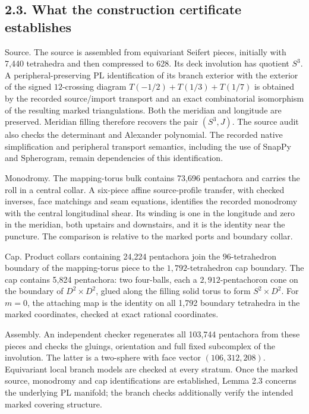 \documentclass[11pt,letterpaper]{article}
\begin{document}
\subsection*{2.3. What the construction certificate establishes}
Source. The source is assembled from equivariant Seifert pieces, initially with 7,440 tetrahedra and then compressed to 628. Its deck involution has quotient $S^3$. A peripheral-preserving PL identification of its branch exterior with the exterior of the signed $12$-crossing diagram $T(-1/2)+T(1/3)+T(1/7)$ is obtained by the recorded source/import transport and an exact combinatorial isomorphism of the resulting marked triangulations. Both the meridian and longitude are preserved. Meridian filling therefore recovers the pair $(S^3,J)$. The source audit also checks the determinant and Alexander polynomial. The recorded native simplification and peripheral transport semantics, including the use of SnapPy and Spherogram, remain dependencies of this identification.

Monodromy. The mapping-torus bulk contains 73,696 pentachora and carries the roll in a central collar. A six-piece affine source-profile transfer, with checked inverses, face matchings and seam equations, identifies the recorded monodromy with the central longitudinal shear. Its winding is one in the longitude and zero in the meridian, both upstairs and downstairs, and it is the identity near the puncture. The comparison is relative to the marked ports and boundary collar.

Cap. Product collars containing 24,224 pentachora join the $96$-tetrahedron boundary of the mapping-torus piece to the $1,792$-tetrahedron cap boundary. The cap contains 5,824 pentachora: two four-balls, each a $2,912$-pentachoron cone on the boundary of $D^2\times D^2$, glued along the filling solid torus to form $S^2\times D^2$. For $m=0$, the attaching map is the identity on all 1,792 boundary tetrahedra in the marked coordinates, checked at exact rational coordinates.

Assembly. An independent checker regenerates all 103,744 pentachora from these pieces and checks the gluings, orientation and full fixed subcomplex of the involution. The latter is a two-sphere with face vector $(106,312,208)$. Equivariant local branch models are checked at every stratum. Once the marked source, monodromy and cap identifications are established, Lemma 2.3 concerns the underlying PL manifold; the branch checks additionally verify the intended marked covering structure.
\end{document}
